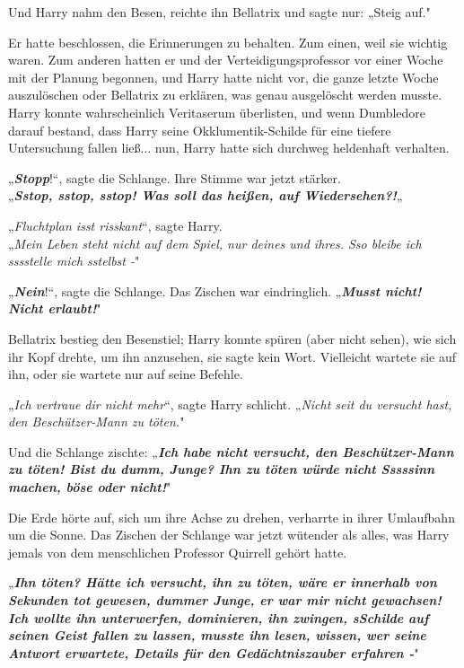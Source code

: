 {Und Harry nahm den Besen, reichte ihn Bellatrix und sagte nur: „Steig auf."

Er hatte beschlossen, die Erinnerungen zu behalten. Zum einen, weil sie wichtig waren. Zum anderen hatten er und der Verteidigungsprofessor vor einer Woche mit der Planung begonnen, und Harry hatte nicht vor, die ganze letzte Woche auszulöschen oder Bellatrix zu erklären, was genau ausgelöscht werden musste.\\ Harry konnte wahrscheinlich Veritaserum überlisten, und wenn Dumbledore darauf bestand, dass Harry seine Okklumentik-Schilde für eine tiefere Untersuchung fallen ließ... nun, Harry hatte sich durchweg heldenhaft verhalten.

„\textbf{\emph{Stopp}}!“, sagte die Schlange. Ihre Stimme war jetzt stärker.\\ „\textbf{\emph{Sstop, sstop, sstop! Was soll das heißen, auf Wiedersehen?!}}„

„\emph{Fluchtplan isst risskant}“, sagte Harry.\\ „\emph{Mein Leben steht nicht auf dem Spiel, nur deines und ihres. Sso bleibe ich sssstelle mich sstelbst -}"

„\textbf{\emph{Nein}}!“, sagte die Schlange. Das Zischen war eindringlich. „\textbf{\emph{Musst nicht! Nicht erlaubt!}}"

Bellatrix bestieg den Besenstiel; Harry konnte spüren (aber nicht sehen), wie sich ihr Kopf drehte, um ihn anzusehen, sie sagte kein Wort. Vielleicht wartete sie auf ihn, oder sie wartete nur auf seine Befehle.

„\emph{Ich vertraue dir nicht mehr}“, sagte Harry schlicht. „\emph{Nicht seit du versucht hast, den Beschützer-Mann zu töten.}"

Und die Schlange zischte: „\textbf{\emph{Ich habe nicht versucht, den Beschützer-Mann zu töten! Bist du dumm, Junge? Ihn zu töten würde nicht Sssssinn machen, böse oder nicht!}}"

Die Erde hörte auf, sich um ihre Achse zu drehen, verharrte in ihrer Umlaufbahn um die Sonne. Das Zischen der Schlange war jetzt wütender als alles, was Harry jemals von dem menschlichen Professor Quirrell gehört hatte.

„\textbf{\emph{Ihn töten? Hätte ich versucht, ihn zu töten, wäre er innerhalb von Sekunden tot gewesen, dummer Junge, er war mir nicht gewachsen! Ich wollte ihn unterwerfen, dominieren, ihn zwingen, sSchilde auf seinen Geist fallen zu lassen, musste ihn lesen, wissen, wer seine Antwort erwartete, Details für den Gedächtniszauber erfahren -}}"

}
